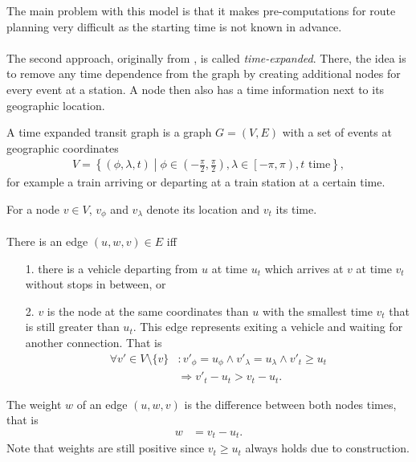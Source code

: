 	The main problem with this model is that it makes pre-computations for route planning very difficult as
	the starting time is not known in advance.\\\\
	The second approach, originally from , is called \textit{time-expanded}.
	There, the idea is to remove any time dependence from the graph by creating additional nodes for every
	event at a station. A node then also has a time information next to its geographic location.
	\begin{mydef}\label{simpleTransitGraph}
		A \textnormal{time expanded transit graph} is a graph $G = (V, E)$ with a set of events at geographic coordinates
		\begin{align*}
			V = \left\{\left(\phi, \lambda, t\right) \middle| \phi \in \left(-\frac{\pi}{2}, \frac{\pi}{2}\right), \lambda \in \left[-\pi, \pi\right), t \text{ time}\right\},
		\end{align*}
		for example a train arriving or departing at a train station at a certain time.
		
		For a node $v \in V$, $v_\phi$ and $v_\lambda$ denote its location and $v_t$  its time.\\\\
		There is an edge $(u, w, v) \in E$ iff
		\begin{itemize}
			\item[1.] there is a vehicle departing from $u$ at time $u_t$ which arrives at $v$ at time $v_t$ without stops in between, or
			\item[2.] $v$ is the node at the same coordinates than $u$ with the smallest time $v_t$ that is still
			greater than $u_t$. This edge represents exiting a vehicle and waiting for another connection. That is
			\begin{align*}
				\forall v' \in V \setminus \{v\}	&: v'_\phi = u_\phi \land v'_\lambda = u_\lambda \land v'_t \ge u_t\\
									&\Rightarrow v'_t - u_t > v_t - u_t.
			\end{align*}
		\end{itemize}
		The weight $w$ of an edge $(u, w, v)$ is the difference between both nodes times, that is
		\begin{align*}
			w	&= v_t - u_t.
		\end{align*}
		Note that weights are still positive since $v_t \ge u_t$ always holds due to construction.
	\end{mydef}
